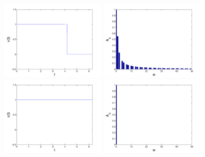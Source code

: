 \begin{refsection}
\begin{figure}
\includegraphics[width=0.45\textwidth]{kugel/Dkonstant/Rechteck3_1.pdf}
\includegraphics[width=0.45\textwidth]{kugel/Dkonstant/Rechteck3_2.pdf}
\includegraphics[width=0.45\textwidth]{kugel/Dkonstant/Rechteck4_1.pdf}
\includegraphics[width=0.45\textwidth]{kugel/Dkonstant/Rechteck4_2.pdf}
\label{skript:Dirac2}%
\end{figure}


\end{refsection}
